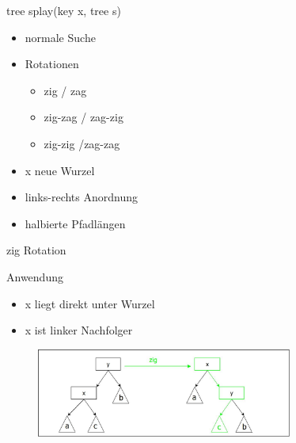\documentclass[11pt]{beamer}
\begin{document}
		\begin{frame}{tree splay(key x, tree s)}
			\begin{itemize}
				\item normale Suche 
				\item Rotationen
					\begin{itemize}
						\item zig / zag
						\item zig-zag / zag-zig 
						\item zig-zig /zag-zag
					\end{itemize}
				\pause
				\item x neue Wurzel
				\pause
				\item links-rechts Anordnung 
				\pause
				\item halbierte Pfadlängen
			\end{itemize}
				
		\end{frame}	
	    
		\begin{frame}{zig  Rotation}
			\begin{block}{Anwendung}
				\begin{itemize}
					\item x liegt direkt unter Wurzel
					\item x ist linker Nachfolger
				\end{itemize}
			\end{block}
			\pause
			\begin{figure}[h]
			\centering
			\includegraphics[width=0.75\textwidth]{"bilder/zigRotation"}
			\end{figure}
			
		\end{frame}	
	
\end{document}
